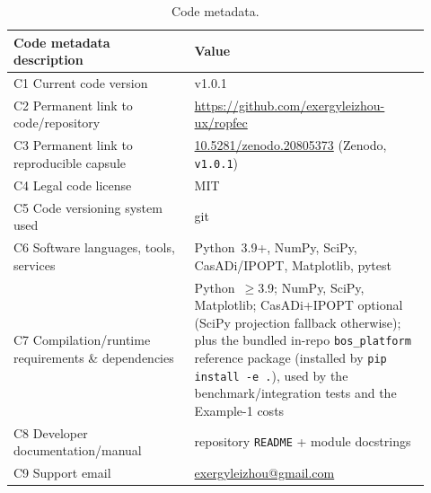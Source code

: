 \documentclass[11pt]{article}
\begin{document}
\begin{table}[h]
\centering
\small
\caption{Code metadata.}
\label{tab:meta}
\renewcommand{\arraystretch}{1.15}
\begin{tabular}{>{\raggedright\arraybackslash}p{0.40\linewidth} >{\raggedright\arraybackslash}p{0.52\linewidth}}
\toprule
\textbf{Code metadata description} & \textbf{Value} \\
\midrule
C1 Current code version & v1.0.1 \\
C2 Permanent link to code/repository & \url{https://github.com/exergyleizhou-ux/ropfec} \\
C3 Permanent link to reproducible capsule & \href{https://doi.org/10.5281/zenodo.20805373}{10.5281/zenodo.20805373} (Zenodo, \texttt{v1.0.1}) \\
C4 Legal code license & MIT \\
C5 Code versioning system used & git \\
C6 Software languages, tools, services & Python~3.9+, NumPy, SciPy, CasADi/IPOPT, Matplotlib, pytest \\
C7 Compilation/runtime requirements \& dependencies & Python~$\ge$3.9; NumPy, SciPy, Matplotlib; CasADi+IPOPT optional (SciPy projection fallback otherwise); plus the bundled in-repo \texttt{bos\_platform} reference package (installed by \texttt{pip install -e .}), used by the benchmark/integration tests and the Example-1 costs \\
C8 Developer documentation/manual & repository \texttt{README} + module docstrings \\
C9 Support email & \href{mailto:exergyleizhou@gmail.com}{exergyleizhou@gmail.com} \\
\bottomrule
\end{tabular}
\end{table}

\end{document}
